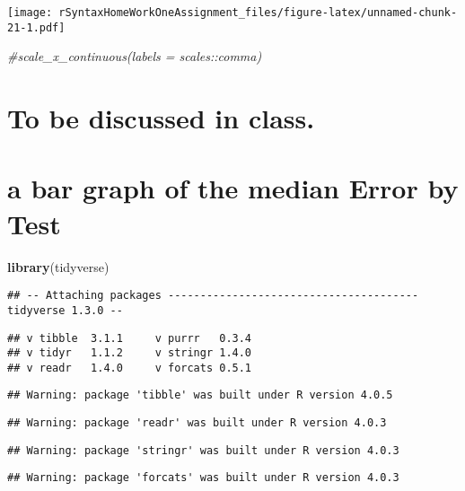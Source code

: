 \documentclass[
]{article}
\newenvironment{Shaded}{\begin{snugshade}}{\end{snugshade}}
\newcommand{\CommentTok}[1]{\textcolor[rgb]{0.56,0.35,0.01}{\textit{#1}}}
\newcommand{\KeywordTok}[1]{\textcolor[rgb]{0.13,0.29,0.53}{\textbf{#1}}}
\newcommand{\NormalTok}[1]{#1}
\begin{document}
\texttt{[image: rSyntaxHomeWorkOneAssignment\_files/figure-latex/unnamed-chunk-21-1.pdf]}

\begin{Shaded}
\begin{Highlighting}[]
  \CommentTok{#scale_x_continuous(labels = scales::comma)}
\end{Highlighting}
\end{Shaded}

\hypertarget{to-be-discussed-in-class.}{%
\section{To be discussed in class.}\label{to-be-discussed-in-class.}}

\hypertarget{a-bar-graph-of-the-median-error-by-test}{%
\section{a bar graph of the median Error by
Test}\label{a-bar-graph-of-the-median-error-by-test}}

\begin{Shaded}
\begin{Highlighting}[]
\KeywordTok{library}\NormalTok{(tidyverse)}
\end{Highlighting}
\end{Shaded}

\begin{verbatim}
## -- Attaching packages --------------------------------------- tidyverse 1.3.0 --
\end{verbatim}

\begin{verbatim}
## v tibble  3.1.1     v purrr   0.3.4
## v tidyr   1.1.2     v stringr 1.4.0
## v readr   1.4.0     v forcats 0.5.1
\end{verbatim}

\begin{verbatim}
## Warning: package 'tibble' was built under R version 4.0.5
\end{verbatim}

\begin{verbatim}
## Warning: package 'readr' was built under R version 4.0.3
\end{verbatim}

\begin{verbatim}
## Warning: package 'stringr' was built under R version 4.0.3
\end{verbatim}

\begin{verbatim}
## Warning: package 'forcats' was built under R version 4.0.3
\end{verbatim}
\end{document}
